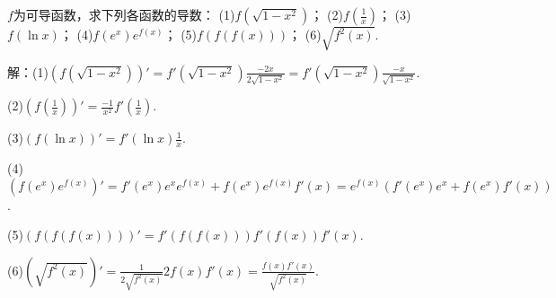 \documentclass[12pt,UTF8]{ctexart}
\begin{document}
\begin{enumerate}
$f$为可导函数，求下列各函数的导数：
\newline
(1)$f(\sqrt{1-x^2})$；
\newline
(2)$f(\frac1x)$；
\newline
(3)$f(\ln x)$；
\newline
(4)$f(e^x)e^{f(x)}$；
\newline
(5)$f(f(f(x)))$；
\newline
(6)$\sqrt{f^2(x)}$.

解：(1)$(f(\sqrt{1-x^2}))'=f'(\sqrt{1-x^2})\frac{-2x}{2\sqrt{1-x^2}}=f'(\sqrt{1-x^2})\frac{-x}{\sqrt{1-x^2}}$.

(2)$(f(\frac1x))'=\frac{-1}{x^2}f'(\frac1x)$.

(3)$(f(\ln x))'=f'(\ln x)\frac1x$.

(4)$(f(e^x)e^{f(x)})'=f'(e^x)e^xe^{f(x)}+f(e^x)e^{f(x)}f'(x)=e^{f(x)}(f'(e^x)e^x+f(e^x)f'(x))$.

(5)$(f(f(f(x))))'=f'(f(f(x)))f'(f(x))f'(x)$.

(6)$(\sqrt{f^2(x)})'=\frac1{2\sqrt{f^2(x)}}2f(x)f'(x)=\frac{f(x)f'(x)}{\sqrt{f^2(x)}}$.
\end{enumerate}
\end{document}
